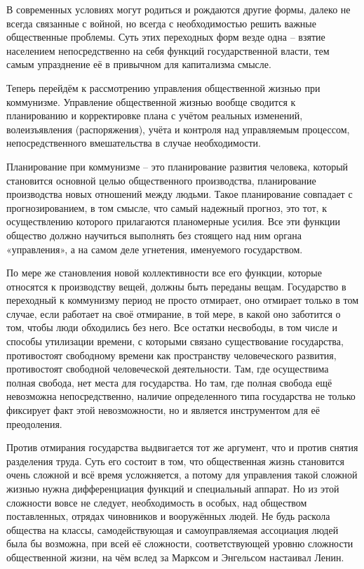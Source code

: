 \documentclass[../main]{subfiles}
\begin{document}
В современных условиях могут родиться и рождаются другие формы, далеко не всегда связанные с войной, но всегда с необходимостью решить важные общественные проблемы. Суть этих переходных форм везде одна – взятие населением непосредственно на себя функций государственной власти, тем самым упразднение её в привычном для капитализма смысле.

Теперь перейдём к рассмотрению управления общественной жизнью при коммунизме. Управление общественной жизнью вообще сводится к планированию и корректировке плана с учётом реальных изменений, волеизъявления (распоряжения), учёта и контроля над управляемым процессом, непосредственного вмешательства в случае необходимости.

Планирование при коммунизме – это планирование развития человека, который становится основной целью общественного производства, планирование производства новых отношений между людьми. Такое планирование совпадает с прогнозированием, в том смысле, что самый надежный прогноз, это тот, к осуществлению которого прилагаются планомерные усилия. Все эти функции общество должно научиться выполнять без стоящего над ним органа «управления», а на самом деле угнетения, именуемого государством.

По мере же становления новой коллективности все его функции, которые относятся к производству вещей, должны быть переданы вещам. Государство в переходный к коммунизму период не просто отмирает, оно отмирает только в том случае, если работает на своё отмирание, в той мере, в какой оно заботится о том, чтобы люди обходились без него. Все остатки несвободы, в том числе и способы утилизации времени, с которыми связано существование государства, противостоят свободному времени как пространству человеческого развития, противостоят свободной человеческой деятельности. Там, где осуществима полная свобода, нет места для государства. Но там, где полная свобода ещё невозможна непосредственно, наличие определенного типа государства не только фиксирует факт этой невозможности, но и является инструментом для её преодоления.

Против отмирания государства выдвигается тот же аргумент, что и против снятия разделения труда. Суть его состоит в том, что общественная жизнь становится очень сложной и всё время усложняется, а потому для управления такой сложной жизнью нужна дифференциация функций и специальный аппарат. Но из этой сложности вовсе не следует, необходимость в особых, над обществом поставленных, отрядах чиновников и вооружённых людей. Не будь раскола общества на классы, самодействующая и самоуправляемая ассоциация людей была бы возможна, при всей её сложности, соответствующей уровню сложности общественной жизни, на чём вслед за Марксом и Энгельсом настаивал Ленин.
\end{document}
